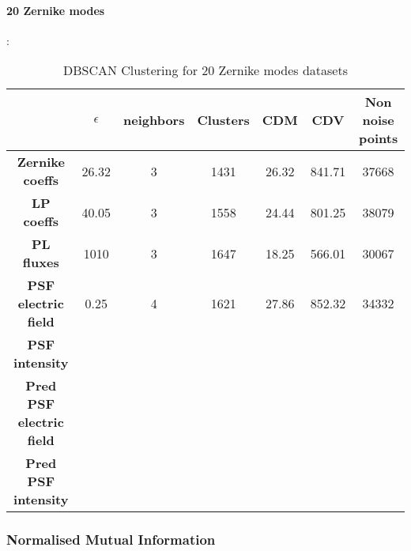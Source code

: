 		\paragraph{20 Zernike modes}:
		\begin{table}[h!]
			\centering
			\begin{tabular}{|c|c|c|c|c|c|c|}
				\hline
				\textbf{} & \textbf{$\epsilon$} & \textbf{neighbors} & \textbf{Clusters} & \textbf{CDM} & \textbf{CDV} & \textbf{Non noise points}\\
				\hline
				\textbf{Zernike coeffs} & 26.32 & 3 & 1431 & 26.32 & 841.71 & 37668 \\
				\hline
				\textbf{LP coeffs} & 40.05 & 3 & 1558 & 24.44 & 801.25 & 38079 \\
				\hline
				\textbf{PL fluxes} & 1010 & 3 & 1647 & 18.25 & 566.01 & 30067 \\
				\hline
				\textbf{PSF electric field} & 0.25 & 4 & 1621 & 27.86 & 852.32 & 34332 \\
				\hline
				\textbf{PSF intensity} &  &  &  &  &  &  \\
				\hline
				\textbf{Pred PSF electric field} &  &  &  &  &  &  \\
				\hline
				\textbf{Pred PSF intensity} &  &  &  &  &  &  \\
				\hline
			\end{tabular}
		\caption{DBSCAN Clustering for 20 Zernike modes datasets}
		\end{table}
		\FloatBarrier
		
		
	\subsubsection{Normalised Mutual Information}
		
